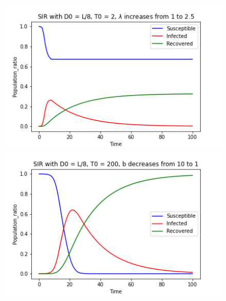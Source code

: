 \documentclass[12pt, reqno]{amsart}
\begin{document}
\begin{figure}[h]
\begin{minipage}[b]{0.4 \textwidth}
            \caption{}
            \label{fig:T0=5}
        \end{minipage}
        \centering
        \begin{minipage}[b]{0.4 \textwidth}
            \includegraphics[width=\textwidth]{./discrete/sir_discrete_grid12.png}
            \caption{}
            \label{fig:T0=2 and lambda=2.5}
        \end{minipage}
        \hfill
        \begin{minipage}[b]{0.4 \textwidth}
            \includegraphics[width=\textwidth]{./discrete/sir_discrete_grid15.png}
            \caption{}
            \label{fig:b}
        \end{minipage}
    \end{figure}
\end{document}
